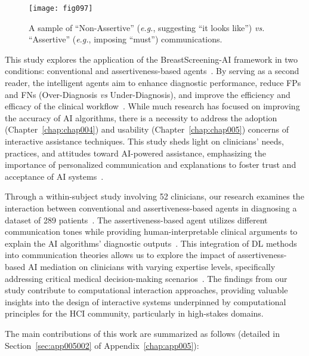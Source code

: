 \begin{figure}[htpb]
\texttt{[image: fig097]}
\caption[]{A sample of ``Non-Assertive'' ({\it e.g.}, suggesting ``it looks like'') {\it vs.} ``Assertive'' ({\it e.g.}, imposing ``must'') communications.}
\label{fig:fig097}
\end{figure}

This study explores the application of the BreastScreening-AI framework in two conditions: conventional and assertiveness-based agents~\cite{pacheco2019alignment, 10.1145/3311350.3347162}.
By serving as a second reader, the intelligent agents aim to enhance diagnostic performance, reduce \acp{FP} and \acp{FN} (Over-Diagnosis {\it vs} Under-Diagnosis), and improve the efficiency and efficacy of the clinical workflow~\cite{CALISTO2022102285, 10.1145/3311350.3347162}.
While much research has focused on improving the accuracy of \ac{AI} algorithms, there is a necessity to address the adoption (Chapter~\ref{chap:chap004}) and usability (Chapter~\ref{chap:chap005}) concerns of interactive assistance techniques.
This study sheds light on clinicians' needs, practices, and attitudes toward \ac{AI}-powered assistance, emphasizing the importance of personalized communication and explanations to foster trust and acceptance of \ac{AI} systems~\cite{10.1145/3491102.3502104, CALISTO2021102607}.

Through a within-subject study involving 52 clinicians, our research examines the interaction between conventional and assertiveness-based agents in diagnosing a dataset of 289 patients~\cite{PELAU2021106855}.
The assertiveness-based agent utilizes different communication tones while providing human-interpretable clinical arguments to explain the \ac{AI} algorithms' diagnostic outputs~\cite{HANCER2023321}.
This integration of \ac{DL} methods into communication theories allows us to explore the impact of assertiveness-based \ac{AI} mediation on clinicians with varying expertise levels, specifically addressing critical medical decision-making scenarios~\cite{Aldoj2020, 8721151}.
The findings from our study contribute to computational interaction approaches, providing valuable insights into the design of interactive systems underpinned by computational principles for the \ac{HCI} community, particularly in high-stakes domains.

\vspace{1.50mm}

\noindent
The main contributions of this work are summarized as follows (detailed in Section~\ref{sec:app005002} of Appendix~\ref{chap:app005}):

